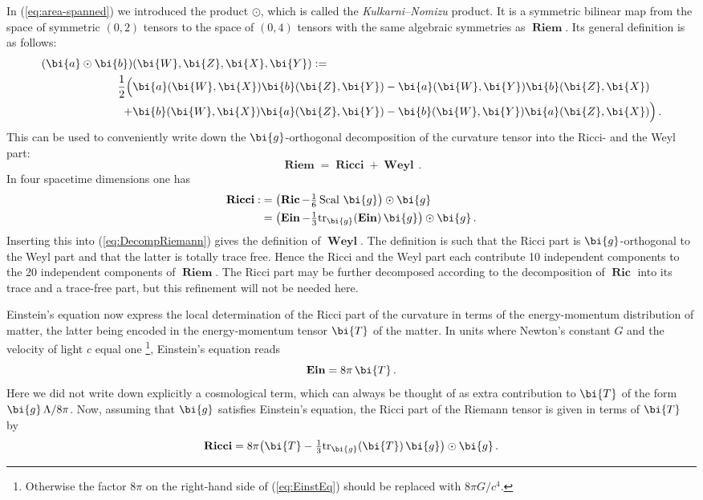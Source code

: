 \documentclass
[rmp,aps,twocolumn,showpacs,preprintnumbers,amsmath,amssymb]{revtex4}
\theoremstyle{plain}
\theoremstyle{definition}
\theoremstyle{remark}
\newcommand{\br}[1]{\mathbf{#1}}              %
\newcommand{\tr}{\mathrm{tr}}                 %
\DeclareMathOperator{\Riem}{\br{Riem}}        %
\DeclareMathOperator{\Weyl}{\br{Weyl}}        %
\DeclareMathOperator{\Ric}{\br{Ric}}          %
\DeclareMathOperator{\Ricci}{\br{Ricci}}      %
\DeclareMathOperator{\Scal}{\mathrm{Scal}}    %
\DeclareMathOperator{\Ein}{\br{Ein}}          %
\newcommand{\g}{\bg}                            %
\newcommand{\ba}{\bi{a}}
\newcommand{\bb}{\bi{b}}
\newcommand{\bg}{\bi{g}}
\newcommand{\bT}{\bi{T}}
\newcommand{\bW}{\bi{W}}
\newcommand{\bX}{\bi{X}}
\newcommand{\bY}{\bi{Y}}
\newcommand{\bZ}{\bi{Z}}
\begin{document}
In (\ref{eq:area-spanned}) we introduced the product $\odot$, 
which is called the \emph{Kulkarni--Nomizu} product. It is a symmetric 
bilinear map from the space of symmetric $(0,2)$ tensors to 
the space of $(0,4)$ tensors with the same algebraic symmetries 
as $\Riem$. Its general definition is as follows:
%
\begin{equation}\label{eq:DefKulkNomProd}
\begin{split}
  (\ba\odot\bb) &(\bW,\bZ,\bX,\bY) := \\
  \frac{1}{2}\Big( &\ba(\bW,\bX)\bb(\bZ,\bY)-\ba(\bW,\bY)\bb(\bZ,\bX) \\
                  +&\bb(\bW,\bX)\ba(\bZ,\bY)-\bb(\bW,\bY)\ba(\bZ,\bX) \Big)\,.
\end{split}
\end{equation}
%
This can be used to conveniently write down the $\g$-orthogonal 
decomposition of the curvature tensor into the Ricci- and the 
Weyl part:
%
\begin{equation}\label{eq:DecompRiemann}
  \Riem = \Ricci + \Weyl\,.
\end{equation}
%
In four spacetime dimensions one has 
%
\begin{subequations}\label{eq:DefRicci}
\begin{align}
\label{eq:DefRicci-Ric}
  \Ricci :
  &= \left( \Ric-\tfrac{1}{6}\Scal\,\g \right) \odot\g \\
\label{eq:DefRicci-Ein}
  &= \left(\Ein-\tfrac{1}{3}\tr_\g(\Ein)\,\g \right)\odot\g \,.  
\end{align}
\end{subequations}
%
Inserting this into (\ref{eq:DecompRiemann}) gives the 
definition of $\Weyl$. The definition is such that the Ricci 
part is $\g$-orthogonal to the Weyl part and that the latter 
is totally trace free. Hence the Ricci and the Weyl part 
each contribute 10 independent components to the 20 independent 
components of $\Riem$. The Ricci part may be further decomposed 
according to the decomposition of $\Ric$ into its trace and a 
trace-free part, but this refinement will not be needed here.  

Einstein's equation now express the local determination of 
the Ricci part of the curvature in terms of the energy-momentum 
distribution of matter, the latter being encoded in the 
energy-momentum tensor $\bT$ of the matter. In units where 
Newton's constant $G$ and the velocity of light $c$ equal one%
\footnote{Otherwise the factor  $8\pi$ on the right-hand side 
of (\ref{eq:EinstEq}) should be replaced with $8\pi G/c^4$.}, 
Einstein's equation reads
%
\begin{equation}\label{eq:EinstEq}
  \Ein = 8\pi\,\bT \,.
\end{equation}
%
Here we did not write down explicitly a cosmological term,
which can always be thought of as extra contribution to $\bT$
of the form $\g\,\Lambda/8\pi$. Now, assuming that $\g$ satisfies 
Einstein's equation, the Ricci part of the Riemann tensor is 
given in terms of $\bT$ by   
%
\begin{equation}\label{eq:RicciPartEinEq}
  \Ricci = 8\pi\bigl( \bT-\tfrac{1}{3}\tr_\g(\bT)\,\g \bigr)\odot\g\,.
\end{equation}
\end{document}
